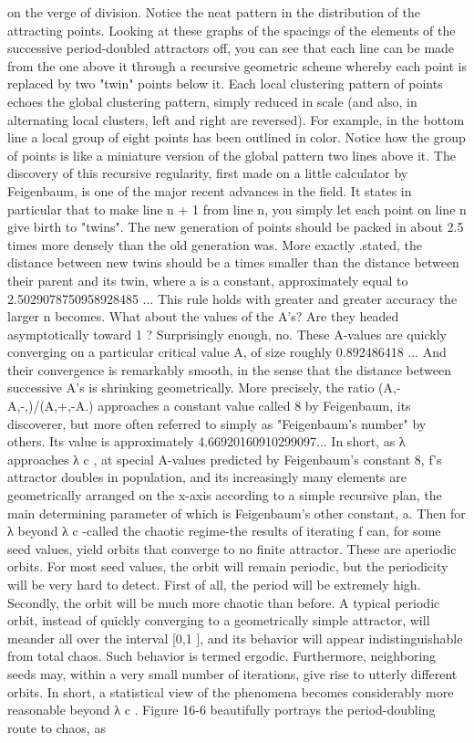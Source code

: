 on the verge of division. Notice the neat pattern in the distribution of the attracting
points. Looking at these graphs of the spacings of the elements of the successive
period-doubled attractors off, you can see that each line can be made from the one
above it through a recursive geometric scheme whereby each point is replaced by two
"twin" points below it. Each local clustering pattern of points echoes the global
clustering pattern, simply reduced in scale (and also, in alternating local clusters, left
and right are reversed). For example, in the bottom line a local group of eight points
has been outlined in color. Notice how the group of points is like a miniature version
of the global pattern two lines above it.
         The discovery of this recursive regularity, first made on a little calculator by
Feigenbaum, is one of the major recent advances in the field. It states in particular that
to make line n + 1 from line n, you simply let each point on line n give birth to
"twins". The new generation of points should be packed in about 2.5 times more
densely than the old generation was. More exactly .stated, the distance between new
twins should be a times smaller than the distance between their parent and its twin,
where a is a constant, approximately equal to 2.5029078750958928485 ... This rule
holds with greater and greater accuracy the larger n becomes.
         What about the values of the A's? Are they headed asymptotically toward 1 ?
Surprisingly enough, no. These A-values are quickly converging on a particular
critical value A, of size roughly 0.892486418 ... And their convergence is remarkably
smooth, in the sense that the distance between successive A's is shrinking
geometrically. More precisely, the ratio (A,-A,-,)/(A,+,-A.) approaches a constant
value called 8 by Feigenbaum, its discoverer, but more often referred to simply as
"Feigenbaum's        number"      by     others.    Its     value    is    approximately
4.66920160910299097...
         In short, as λ approaches λ c , at special A-values predicted by Feigenbaum's
constant 8, f's attractor doubles in population, and its increasingly many elements are
geometrically arranged on the x-axis according to a simple recursive plan, the main
determining parameter of which is Feigenbaum's other constant, a.
         Then for λ beyond λ c -called the chaotic regime-the results of iterating f can,
for some seed values, yield orbits that converge to no finite attractor. These are
aperiodic orbits. For most seed values, the orbit will remain periodic, but the
periodicity will be very hard to detect. First of all, the period will be extremely high.
Secondly, the orbit will be much more chaotic than before. A typical periodic orbit,
instead of quickly converging to a geometrically simple attractor, will meander all
over the interval [0,1 ], and its behavior will appear indistinguishable from total
chaos. Such behavior is termed ergodic. Furthermore, neighboring seeds may, within
a very small number of iterations, give rise to utterly different orbits. In short, a
statistical view of the phenomena becomes considerably more reasonable beyond λ c .
         Figure 16-6 beautifully portrays the period-doubling route to chaos, as




